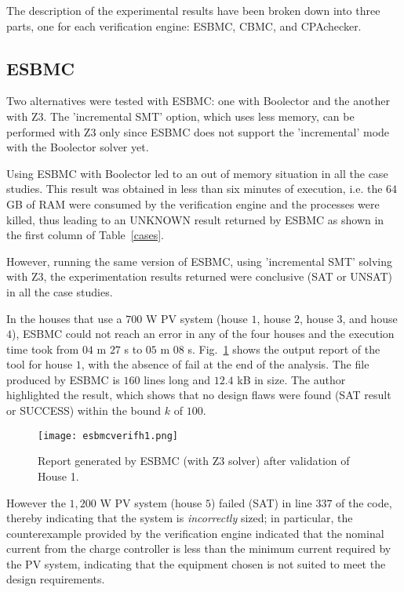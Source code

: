 The description of the experimental results have been broken down into three parts, one for each verification engine: ESBMC, CBMC, and CPAchecker. 

\subsection{ESBMC}
\label{sec:ESBMCverification}

Two alternatives were tested with ESBMC: one with Boolector and the another with Z3. The 'incremental SMT' option, which uses less memory, can be performed with Z3 only since ESBMC does not support the 'incremental' mode with the Boolector solver yet. 

Using ESBMC with Boolector led to an out of memory situation in all the case studies. This result was obtained in less than six minutes of execution, i.e. the $64$ GB of RAM were consumed by the verification engine and the processes were killed, thus leading to an UNKNOWN result returned by ESBMC as shown in the first column of Table~\ref{cases}. 

However, running the same version of ESBMC, using 'incremental SMT' solving with Z3, the experimentation results returned were conclusive (SAT or UNSAT) in all the case studies. 

In the houses that use a $700$ W PV system (house $1$, house $2$, house $3$, and house $4$), ESBMC could not reach an error in any of the four houses and the execution time took from $04$ m $27$ s to $05$ m $08$ s. Fig.~\ref{fig:esbmcverifhouse1} shows the output report of the tool for house $1$, with the absence of fail at the end of the analysis. The file produced by ESBMC is $160$ lines long and $12.4$ kB in size. The author highlighted the result, which shows that no design flaws were found (SAT result or SUCCESS) within the bound $k$ of $100$.

\begin{figure}[h]
\texttt{[image: esbmcverifh1.png]}
\centering
\caption{Report generated by ESBMC (with Z3 solver) after validation of House 1.}
\label{fig:esbmcverifhouse1}
\end{figure}

However the $1,200$ W PV system (house $5$) failed (SAT) in line $337$ of the code, thereby indicating that the system is \textit{incorrectly} sized; in particular, the counterexample provided by the verification engine indicated that the nominal current from the charge controller is less than the minimum current required by the PV system, indicating that the equipment chosen is not suited to meet the design requirements.

